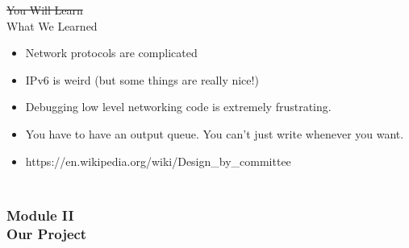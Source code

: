 \documentclass[professionalfonts, t, aspectratio=1610]{beamer}
\begin{document}

\renewcommand{\baselinestretch}{1.3}
\begin{frame}{\sout{You Will Learn}\\What We Learned}
\begin{itemize}
\item[\textbullet] Network protocols are complicated
\pause
\item[\textbullet] IPv6 is weird (but some things are really nice!)
\pause
\item[\textbullet] Debugging low level networking code is extremely frustrating.
\pause
\item[\textbullet] You have to have an output queue. You can't just write whenever you want. 
\pause
\item[\textbullet] https://en.wikipedia.org/wiki/Design\_by\_committee

\end{itemize}
\end{frame}


\begin{frame}
\frametitle{ %
\bigskip \bigskip \bigskip \bigskip \bigskip \bigskip \\
Module II \\ \bigskip
Our Project} 
\end{frame}
\end{document}
